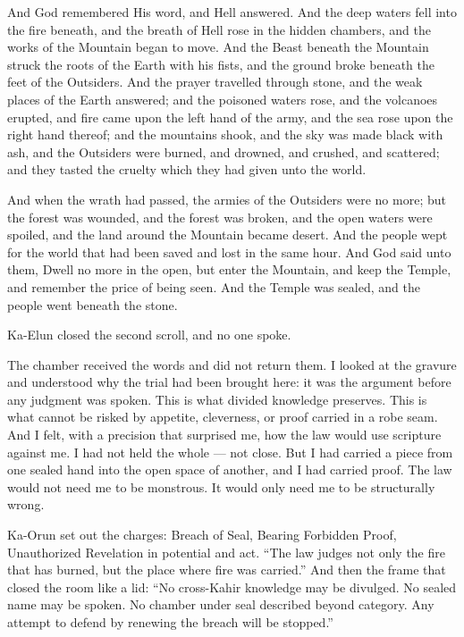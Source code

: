 \begin{scripture}
And God remembered His word, and Hell answered.
And the deep waters fell into the fire beneath, and the breath of Hell rose in the hidden chambers, and the works of the Mountain began to move.
And the Beast beneath the Mountain struck the roots of the Earth with his fists, and the ground broke beneath the feet of the Outsiders.
And the prayer travelled through stone, and the weak places of the Earth answered; and the poisoned waters rose, and the volcanoes erupted, and fire came upon the left hand of the army, and the sea rose upon the right hand thereof; and the mountains shook, and the sky was made black with ash, and the Outsiders were burned, and drowned, and crushed, and scattered; and they tasted the cruelty which they had given unto the world.
\end{scripture}
 
\begin{scripture}
And when the wrath had passed, the armies of the Outsiders were no more; but the forest was wounded, and the forest was broken, and the open waters were spoiled, and the land around the Mountain became desert.
And the people wept for the world that had been saved and lost in the same hour.
And God said unto them, Dwell no more in the open, but enter the Mountain, and keep the Temple, and remember the price of being seen.
And the Temple was sealed, and the people went beneath the stone.
\end{scripture}
 
Ka-Elun closed the second scroll, and no one spoke.\par
 
The chamber received the words and did not return them. I looked at the gravure and understood why the trial had been brought here: it was the argument before any judgment was spoken. This is what divided knowledge preserves. This is what cannot be risked by appetite, cleverness, or proof carried in a robe seam. And I felt, with a precision that surprised me, how the law would use scripture against me. I had not held the whole — not close. But I had carried a piece from one sealed hand into the open space of another, and I had carried proof. The law would not need me to be monstrous. It would only need me to be structurally wrong.\par
 
Ka-Orun set out the charges: Breach of Seal, Bearing Forbidden Proof, Unauthorized Revelation in potential and act. ``The law judges not only the fire that has burned, but the place where fire was carried.'' And then the frame that closed the room like a lid: ``No cross-Kahir knowledge may be divulged. No sealed name may be spoken. No chamber under seal described beyond category. Any attempt to defend by renewing the breach will be stopped.''\par
 
